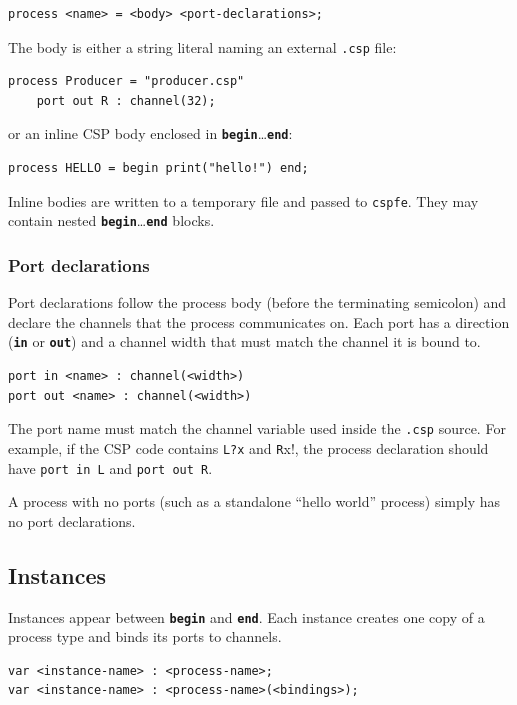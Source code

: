 \documentclass[11pt]{article}
\newcommand{\keyword}[1]{\texttt{\textbf{#1}}}
\begin{document}
\begin{Verbatim}[samepage=true]
process <name> = <body> <port-declarations>;
\end{Verbatim}

The body is either a string literal naming an external \texttt{.csp} file:
\begin{Verbatim}[samepage=true]
process Producer = "producer.csp"
    port out R : channel(32);
\end{Verbatim}

or an inline CSP body enclosed in \keyword{begin}\ldots\keyword{end}:
\begin{Verbatim}[samepage=true]
process HELLO = begin print("hello!") end;
\end{Verbatim}

Inline bodies are written to a temporary file and passed to
\texttt{cspfe}.  They may contain nested
\keyword{begin}\ldots\keyword{end} blocks.

\subsubsection{Port declarations}

Port declarations follow the process body (before the terminating
semicolon) and declare the channels that the process communicates on.
Each port has a direction (\keyword{in} or \keyword{out}) and a
channel width that must match the channel it is bound to.

\begin{Verbatim}[samepage=true]
port in <name> : channel(<width>)
port out <name> : channel(<width>)
\end{Verbatim}

The port name must match the channel variable used inside the
\texttt{.csp} source.  For example, if the CSP code contains
\verb!L?x! and \verb!R!x!, the process declaration should have
\verb!port in L! and \verb!port out R!.

A process with no ports (such as a standalone ``hello world'' process)
simply has no port declarations.

\subsection{Instances}

Instances appear between \keyword{begin} and \keyword{end}.
Each instance creates one copy of a process type and binds its
ports to channels.

\begin{Verbatim}[samepage=true]
var <instance-name> : <process-name>;
var <instance-name> : <process-name>(<bindings>);
\end{Verbatim}
\end{document}
